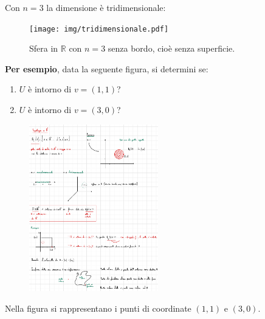 \documentclass[a4paper]{article}
\begin{document}
	\noindent
	Con $n = 3$ la dimensione è tridimensionale:
	
	\begin{figure}[!htp]
		\centering
		\texttt{[image: img/tridimensionale.pdf]}
		\caption{Sfera in $\mathbb{R}$ con $n = 3$ senza bordo, cioè senza superficie.}
	\end{figure}

	\newpage
	
	\noindent{}
	\:\newline

	\noindent
	\textcolor{Green4}{\textbf{Per esempio}}, data la seguente figura, si determini se:
	
	\begin{enumerate}
		\item $U$ è intorno di $v = \left(1,1\right)$?
		
		\item $U$ è intorno di $v = \left(3,0\right)$?
	\end{enumerate}

	\begin{figure}[!htp]
		\centering
		\includegraphics[width=0.5\textwidth]{img/esempio_topologia.pdf}
	\end{figure}

	\noindent
	Nella figura si rappresentano i punti di coordinate $\left(1,1\right)$ e $\left(3,0\right)$.\newline
	
\end{document}
